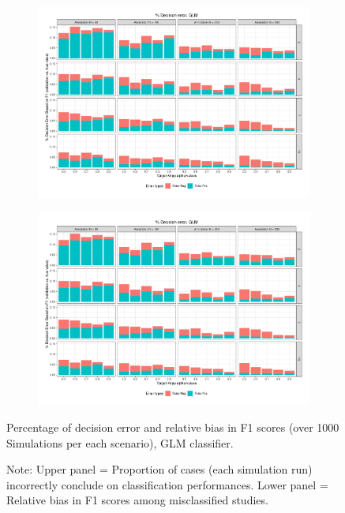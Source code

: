 \documentclass[man, 12pt, a4paper, nolmodern, noextraspace]{apa6}
\begin{document}
\begin{figure}
    \centering
    \begin{subfigure}[t]{0.95\textwidth}
        \centering
        \includegraphics[clip, width=\linewidth, page = 1]{Results/GLM_summary_05.pdf} 
    \end{subfigure}
    \begin{subfigure}[t]{0.95\textwidth}
        \centering
        \includegraphics[clip, width=\linewidth, page = 2]{Results/GLM_summary_05.pdf} 
    \end{subfigure}
    
    \captionsetup{format=hang}
    \caption{Percentage of decision error and relative bias in F1 scores (over 1000 Simulations per each scenario), GLM classifier.} 
    \label{fig:Figure3}
    \captionsetup{font=small}
    \caption*{Note: Upper panel = Proportion of cases (each simulation run) incorrectly conclude on classification performances. Lower panel = Relative bias in F1 scores among misclassified studies.}
\end{figure}     
\end{document}
